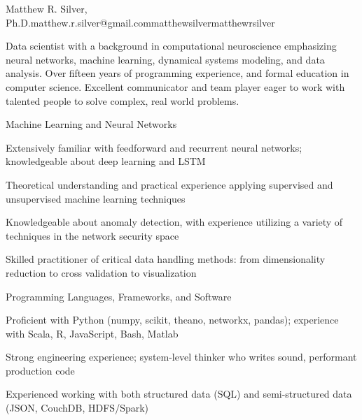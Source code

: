 \documentclass{report}
\begin{document}

  \begin{resume_header}{Matthew R. Silver, Ph.D.}{matthew.r.silver@gmail.com}{}{matthewsilver}{matthewrsilver}

    Data scientist with a background in computational neuroscience emphasizing neural networks, machine learning, dynamical systems modeling, and data analysis. Over fifteen years of programming experience, and formal education in computer science. Excellent communicator and team player eager to work with talented people to solve complex, real world problems.

  \end{resume_header}





  \begin{skillset}{Machine Learning and Neural Networks}
    \item Extensively familiar with feedforward and recurrent neural networks; knowledgeable about deep learning and LSTM
    \item Theoretical understanding and practical experience applying supervised and unsupervised machine learning techniques
    \item Knowledgeable about anomaly detection, with experience utilizing a variety of techniques in the network security space
    \item Skilled practitioner of critical data handling methods: from dimensionality reduction to cross validation to visualization
  \end{skillset}

  \begin{skillset}{Programming Languages, Frameworks, and Software}
    \item Proficient with Python (numpy, scikit, theano, networkx, pandas); experience with Scala, R, JavaScript, Bash, Matlab
    \item Strong \CC{} engineering experience; system-level thinker who writes sound, performant production code
    \item Experienced working with both structured data (SQL) and semi-structured data (JSON, CouchDB, HDFS/Spark)
  \end{skillset}
\end{document}
